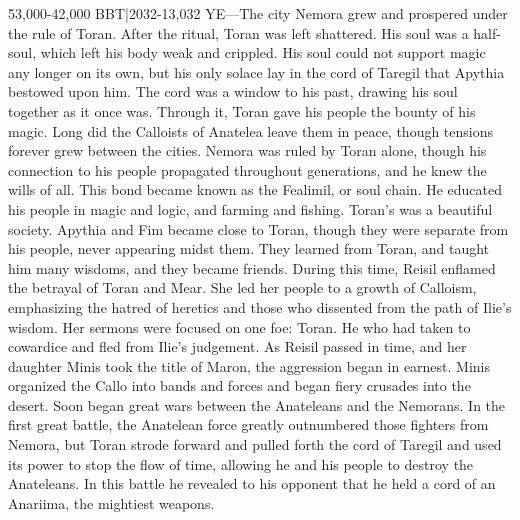\documentclass[smalldemyvopaper,11pt,twoside,onecolumn,openright,extrafontsizes]{memoir}
\begin{document}
53,000-42,000 BBT|2032-13,032 YE—The city Nemora grew and prospered under the rule of Toran. After the ritual, Toran was left shattered. His soul was a half-soul, which left his body weak and crippled. His soul could not support magic any longer on its own, but his only solace lay in the cord of Taregil that Apythia bestowed upon him. The cord was a window to his past, drawing his soul together as it once was. Through it, Toran gave his people the bounty of his magic. Long did the Calloists of Anatelea leave them in peace, though tensions forever grew between the cities. Nemora was ruled by Toran alone, though his connection to his people propagated throughout generations, and he knew the wills of all. This bond became known as the Fealimil, or soul chain. He educated his people in magic and logic, and farming and fishing. Toran’s was a beautiful society. Apythia and Fim became close to Toran, though they were separate from his people, never appearing midst them. They learned from Toran, and taught him many wisdoms, and they became friends.
	During this time, Reisil enflamed the betrayal of Toran and Mear. She led her people to a growth of Calloism, emphasizing the hatred of heretics and those who dissented from the path of Ilie’s wisdom. Her sermons were focused on one foe: Toran. He who had taken to cowardice and fled from Ilie’s judgement. As Reisil passed in time, and her daughter Minis took the title of Maron, the aggression began in earnest. Minis organized the Callo into bands and forces and began fiery crusades into the desert. Soon began great wars between the Anateleans and the Nemorans. In the first great battle, the Anatelean force greatly outnumbered those fighters from Nemora, but Toran strode forward and pulled forth the cord of Taregil and used its power to stop the flow of time, allowing he and his people to destroy the Anateleans. In this battle he revealed to his opponent that he held a cord of an Anariima, the mightiest weapons.
\end{document}
